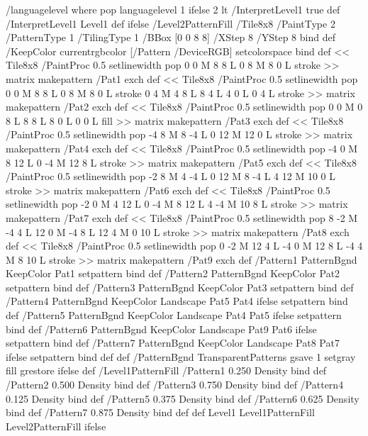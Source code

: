 %
/languagelevel where
 {pop languagelevel} {1} ifelse
 2 lt
	{/InterpretLevel1 true def}
	{/InterpretLevel1 Level1 def}
 ifelse
%
%
/Level2PatternFill {
/Tile8x8 {/PaintType 2 /PatternType 1 /TilingType 1 /BBox [0 0 8 8] /XStep 8 /YStep 8}
	bind def
/KeepColor {currentrgbcolor [/Pattern /DeviceRGB] setcolorspace} bind def
<< Tile8x8
 /PaintProc {0.5 setlinewidth pop 0 0 M 8 8 L 0 8 M 8 0 L stroke} 
>> matrix makepattern
/Pat1 exch def
<< Tile8x8
 /PaintProc {0.5 setlinewidth pop 0 0 M 8 8 L 0 8 M 8 0 L stroke
	0 4 M 4 8 L 8 4 L 4 0 L 0 4 L stroke}
>> matrix makepattern
/Pat2 exch def
<< Tile8x8
 /PaintProc {0.5 setlinewidth pop 0 0 M 0 8 L
	8 8 L 8 0 L 0 0 L fill}
>> matrix makepattern
/Pat3 exch def
<< Tile8x8
 /PaintProc {0.5 setlinewidth pop -4 8 M 8 -4 L
	0 12 M 12 0 L stroke}
>> matrix makepattern
/Pat4 exch def
<< Tile8x8
 /PaintProc {0.5 setlinewidth pop -4 0 M 8 12 L
	0 -4 M 12 8 L stroke}
>> matrix makepattern
/Pat5 exch def
<< Tile8x8
 /PaintProc {0.5 setlinewidth pop -2 8 M 4 -4 L
	0 12 M 8 -4 L 4 12 M 10 0 L stroke}
>> matrix makepattern
/Pat6 exch def
<< Tile8x8
 /PaintProc {0.5 setlinewidth pop -2 0 M 4 12 L
	0 -4 M 8 12 L 4 -4 M 10 8 L stroke}
>> matrix makepattern
/Pat7 exch def
<< Tile8x8
 /PaintProc {0.5 setlinewidth pop 8 -2 M -4 4 L
	12 0 M -4 8 L 12 4 M 0 10 L stroke}
>> matrix makepattern
/Pat8 exch def
<< Tile8x8
 /PaintProc {0.5 setlinewidth pop 0 -2 M 12 4 L
	-4 0 M 12 8 L -4 4 M 8 10 L stroke}
>> matrix makepattern
/Pat9 exch def
/Pattern1 {PatternBgnd KeepColor Pat1 setpattern} bind def
/Pattern2 {PatternBgnd KeepColor Pat2 setpattern} bind def
/Pattern3 {PatternBgnd KeepColor Pat3 setpattern} bind def
/Pattern4 {PatternBgnd KeepColor Landscape {Pat5} {Pat4} ifelse setpattern} bind def
/Pattern5 {PatternBgnd KeepColor Landscape {Pat4} {Pat5} ifelse setpattern} bind def
/Pattern6 {PatternBgnd KeepColor Landscape {Pat9} {Pat6} ifelse setpattern} bind def
/Pattern7 {PatternBgnd KeepColor Landscape {Pat8} {Pat7} ifelse setpattern} bind def
} def
%
%
%
/PatternBgnd {
  TransparentPatterns {} {gsave 1 setgray fill grestore} ifelse
} def
%
%
/Level1PatternFill {
/Pattern1 {0.250 Density} bind def
/Pattern2 {0.500 Density} bind def
/Pattern3 {0.750 Density} bind def
/Pattern4 {0.125 Density} bind def
/Pattern5 {0.375 Density} bind def
/Pattern6 {0.625 Density} bind def
/Pattern7 {0.875 Density} bind def
} def
%
%
Level1 {Level1PatternFill} {Level2PatternFill} ifelse
